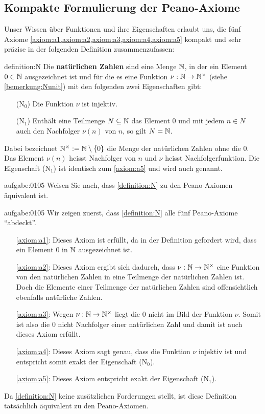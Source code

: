 \subsection{Kompakte Formulierung der Peano-Axiome}\label{subsec:kompakt}
Unser Wissen über Funktionen und ihre Eigenschaften erlaubt uns, die fünf Axiome \cref{axiom:a1,axiom:a2,axiom:a3,axiom:a4,axiom:a5} kompakt und sehr präzise in der folgenden Definition zusammenzufassen:
\begin{definition}{definition:N}
Die \textbf{natürlichen Zahlen} sind eine Menge $\mathbb{N}$, in der ein Element $0\in\mathbb{N}$ ausgezeichnet ist und für die es eine Funktion $\nu:\mathbb{N}\to\mathbb{N}^{\times}$ (siehe \cref{bemerkung:Nunit}) mit den folgenden zwei Eigenschaften gibt:
\begin{itemize}
  \item[(N$_0$)] Die Funktion $\nu$ ist injektiv.
  \item[(N$_1$)] Enthält eine Teilmenge $N\subseteq\mathbb{N}$ das Element $0$ und mit jedem $n\in N$ auch den Nachfolger $\nu(n)$ von $n$, so gilt $N=\mathbb{N}$.
\end{itemize}
\end{definition}
Dabei bezeichnet $\mathbb{N}^{\times}:=\mathbb{N}\setminus{\left\{0\right\}}$ die Menge der natürlichen Zahlen ohne die $0$. Das Element $\nu(n)$ heisst Nachfolger von $n$ und $\nu$ heisst Nachfolgerfunktion. Die Eigenschaft (N$_1$) ist identisch zum \cref{axiom:a5} und wird auch  genannt.
\begin{aufgabe}{aufgabe:0105}
Weisen Sie nach, dass \cref{definition:N} zu den Peano-Axiomen äquivalent ist.
\end{aufgabe}
\begin{antwort}{aufgabe:0105}
Wir zeigen zuerst, dass \cref{definition:N} alle fünf Peano-Axiome \enquote{abdeckt}.
\begin{itemize}
    \item[\cref{axiom:a1}:] Dieses Axiom ist erfüllt, da in der Definition gefordert wird, dass ein Element $0$ in $\mathbb{N}$ ausgezeichnet ist.
    \item[\cref{axiom:a2}:] Dieses Axiom ergibt sich dadurch, dass $\nu:\mathbb{N}\to\mathbb{N}^{\times}$ eine Funktion von den natürlichen Zahlen in eine Teilmenge der natürlichen Zahlen ist. Doch die Elemente einer Teilmenge der natürlichen Zahlen sind offensichtlich ebenfalls natürliche Zahlen.
    \item[\cref{axiom:a3}:] Wegen $\nu:\mathbb{N}\to\mathbb{N}^{\times}$ liegt die $0$ nicht im Bild der Funktion $\nu$. Somit ist also die $0$ nicht Nachfolger einer natürlichen Zahl und damit ist auch dieses Axiom erfüllt.
    \item[\cref{axiom:a4}:] Dieses Axiom sagt genau, dass die Funktion $\nu$ injektiv ist und entspricht somit exakt der Eigenschaft (N$_0$).
    \item[\cref{axiom:a5}:] Dieses Axiom entspricht exakt der Eigenschaft (N$_1$).
\end{itemize}
Da \cref{definition:N} keine zusätzlichen Forderungen stellt, ist diese Definition tatsächlich äquivalent zu den Peano-Axiomen.
\end{antwort}

